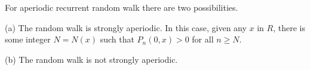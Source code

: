 For aperiodic recurrent random walk there are two possibilities.

(a) The random walk is strongly aperiodic. In this case, given any $x$ in $R$, there is some integer $N = N(x)$ such that $P_n(0,x) > 0$ for all $n \geq N$.

(b) The random walk is not strongly aperiodic.